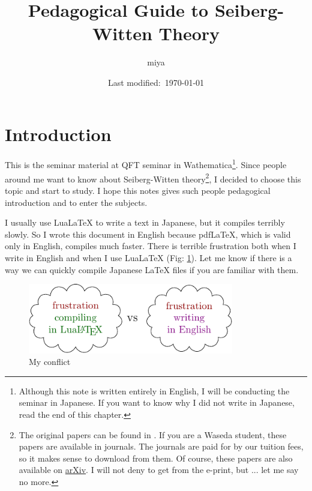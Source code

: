 \documentclass[a4paper,pdftex,10pt]{article}
\begin{document}
\title{
  Pedagogical Guide to Seiberg-Witten Theory
}
\author{
  miya
}
\date{Last modified:\ \today}

\maketitle

\tableofcontents

\clearpage
\section{Introduction}

  This is the seminar material at QFT seminar in Wathematica\footnote{
    Although this note is written entirely in English, I will be conducting the seminar in Japanese. If you want to know why I did not write in Japanese, read the end of this chapter.
  }. Since people around me want to know about Seiberg-Witten theory\footnote{
    The original papers can be found in \cite{Seiberg:1994rs, Seiberg:1994aj}. If you are a Waseda student, these papers are available in journals. The journals are paid for by our tuition fees, so it makes sense to download from them. Of course, these papers are also available on \href{https://arxiv.org}{arXiv}. I will not deny to get from the e-print, but ... let me say no more.
  }, I decided to choose this topic and start to study. I hope this notes gives such people pedagogical introduction and to enter the subjects.




  


  \begin{graybox}
    I usually use Lua{\LaTeX} to write a text in Japanese, but it compiles terribly slowly. So I wrote this document in English because pdf{\LaTeX}, which is valid only in English, compiles much faster. There is terrible frustration both when I write in English and when I use Lua{\LaTeX} (Fig: \ref{fig:myconflict}). Let me know if there is a way we can quickly compile Japanese {\LaTeX} files if you are familiar with them.
  \end{graybox}

  \begin{figure}[ht]
    \centering
    \includegraphics[width=0.8\textwidth]{fig/picture01.pdf}
    \caption{My conflict}
    \label{fig:myconflict}
  \end{figure}
  
\end{document}
